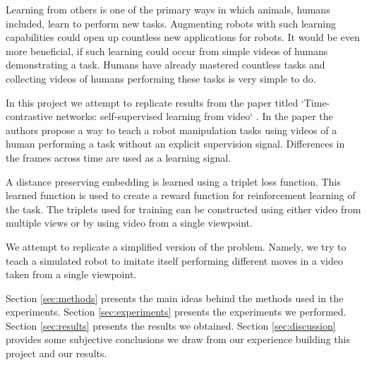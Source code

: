 
Learning from others is one of the primary ways in which animals, humans included, learn to perform new tasks. Augmenting robots with such learning capabilities could open up countless new applications for robots. It would be even more beneficial, if such learning could occur from simple videos of humans demonstrating a task. Humans have already mastered countless tasks and collecting videos of humans performing these tasks is very simple to do.

In this project we attempt to replicate results from the paper titled `Time-contrastive networks: self-supervised learning from video` \cite{self-supervised-learning}. In the paper the authors propose a way to teach a robot manipulation tasks using videos of a human performing a task without an explicit supervision signal. Differences in the frames across time are used as a learning signal.

A distance preserving embedding is learned using a triplet loss function. This learned function is used to create a reward function for reinforcement learning of the task. The triplets used for training can be constructed using either video from multiple views or by using video from a single viewpoint.

We attempt to replicate a simplified version of the problem. Namely, we try to teach a simulated robot to imitate itself performing different moves in a video taken from a single viewpoint.

Section \ref{sec:methods} presents the main ideas behind the methods used in the experiments. Section \ref{sec:experiments} presents the experiments we performed. Section \ref{sec:results} presents the results we obtained. Section \ref{sec:discussion} provides some subjective conclusions we draw from our experience building this project and our results.



